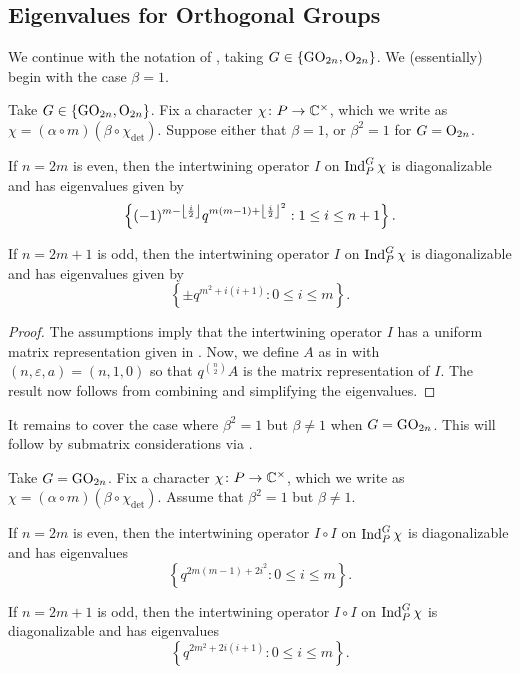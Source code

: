 \subsection{Eigenvalues for Orthogonal Groups}
We continue with the notation of , taking $G\in\{\mathrm{GO}_{2n},\mathrm{O}_{2n}\}$. We (essentially) begin with the case $\beta=1$.
\begin{theorem} \label{thm:o-trivial-eigens}
    Take $G\in\{\mathrm{GO}_{2n},\mathrm{O}_{2n}\}$. Fix a character $\chi\colon P\to\mathbb C^\times$, which we write as $\chi=(\alpha\circ m)(\beta\circ\chi_{\det})$. Suppose either that $\beta=1$, or $\beta^2=1$ for $G=\mathrm{O}_{2n}$.
    \begin{listalph}
        \item If $n=2m$ is even, then the intertwining operator $I$ on $\operatorname{Ind}_P^G\chi$ is diagonalizable and has eigenvalues given by
        \[\left\{(-1)^{m-\left\lfloor{\frac i2}\right\rfloor}q^{m(m-1)+\left\lfloor{\frac i2}\right\rfloor^2}:1\le i\le n+1\right\}.\]
        \item If $n=2m+1$ is odd, then the intertwining operator $I$ on $\operatorname{Ind}_P^G\chi$ is diagonalizable and has eigenvalues given by
        \[\left\{\pm q^{m^2+i(i+1)}:0\le i\le m\right\}.\]
    \end{listalph}
\end{theorem}
\begin{proof}
    The assumptions imply that the intertwining operator $I$ has a uniform matrix representation given in . Now, we define $A$ as in  with $(n,\varepsilon,a)=(n,1,0)$ so that $q^{\binom n2}A$ is the matrix representation of $I$. The result now follows from combining  and simplifying the eigenvalues.
\end{proof}
It remains to cover the case where $\beta^2=1$ but $\beta\ne1$ when $G=\mathrm{GO}_{2n}$. This will follow by submatrix considerations via .
\begin{theorem} \label{thm:go-quad-eigens}
    Take $G=\mathrm{GO}_{2n}$. Fix a character $\chi\colon P\to\mathbb C^\times$, which we write as $\chi=(\alpha\circ m)(\beta\circ\chi_{\det})$. Assume that $\beta^2=1$ but $\beta\ne1$.
    \begin{listalph}
        \item If $n=2m$ is even, then the intertwining operator $I\circ I$ on $\operatorname{Ind}_P^G\chi$ is diagonalizable and has eigenvalues
        \[\left\{q^{2m(m-1)+2i^2}:0\le i\le m\right\}.\]
        \item If $n=2m+1$ is odd, then the intertwining operator $I\circ I$ on $\operatorname{Ind}_P^G\chi$ is diagonalizable and has eigenvalues
        \[\left\{q^{2m^2+2i(i+1)}:0\le i\le m\right\}.\]
    \end{listalph}
\end{theorem}
